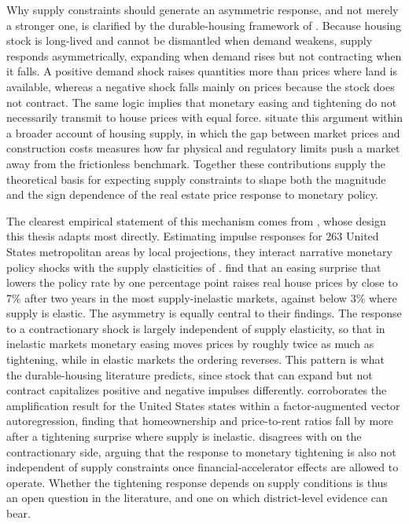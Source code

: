 \documentclass[a4paper,12pt, headsepline]{scrartcl}
\numberwithin{equation}{section}
\begin{document}
Why supply constraints should generate an asymmetric response, and not merely a stronger one, is clarified by the durable-housing framework of \citet{glaeser2005}. Because housing stock is long-lived and cannot be dismantled when demand weakens, supply responds asymmetrically, expanding when demand rises but not contracting when it falls. A positive demand shock raises quantities more than prices where land is available, whereas a negative shock falls mainly on prices because the stock does not contract. The same logic implies that monetary easing and tightening do not necessarily transmit to house prices with equal force. \citet{glaeser2018} situate this argument within a broader account of housing supply, in which the gap between market prices and construction costs measures how far physical and regulatory limits push a market away from the frictionless benchmark. Together these contributions supply the theoretical basis for expecting supply constraints to shape both the magnitude and the sign dependence of the real estate price response to monetary policy.

The clearest empirical statement of this mechanism comes from \citet{aastveit2022}, whose design this thesis adapts most directly. Estimating impulse responses for 263 United States metropolitan areas by local projections, they interact narrative monetary policy shocks with the supply elasticities of \citet{saiz2010}. \citet{aastveit2022} find that an easing surprise that lowers the policy rate by one percentage point raises real house prices by close to 7\% after two years in the most supply-inelastic markets, against below 3\% where supply is elastic. The asymmetry is equally central to their findings. The response to a contractionary shock is largely independent of supply elasticity, so that in inelastic markets monetary easing moves prices by roughly twice as much as tightening, while in elastic markets the ordering reverses. This pattern is what the durable-housing literature predicts, since stock that can expand but not contract capitalizes positive and negative impulses differently. \citet{albuquerque2024} corroborates the amplification result for the United States states within a factor-augmented vector autoregression, finding that homeownership and price-to-rent ratios fall by more after a tightening surprise where supply is inelastic. \citet{albuquerque2024} disagrees with \citet{aastveit2022} on the contractionary side, arguing that the response to monetary tightening is also not independent of supply constraints once financial-accelerator effects are allowed to operate. Whether the tightening response depends on supply conditions is thus an open question in the literature, and one on which district-level evidence can bear.
\end{document}
